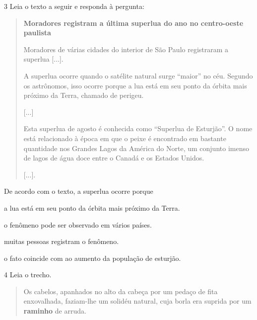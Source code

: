 \num{3} Leia o texto a seguir e responda à pergunta:

\begin{quote}
\textbf{Moradores registram a última superlua do ano no centro-oeste
paulista}

Moradores de várias cidades do interior de São Paulo registraram a
superlua {[}...{]}.

A superlua ocorre quando o satélite natural surge “maior” no céu.
Segundo os astrônomos, isso ocorre porque a lua está em seu ponto da
órbita mais próximo da Terra, chamado de perigeu.

{[}...{]}

Esta superlua de agosto é conhecida como “Superlua de Esturjão”. O
nome está relacionado à época em que o peixe é encontrado em bastante
quantidade nos Grandes Lagos da América do Norte, um conjunto imenso de
lagos de água doce entre o Canadá e os Estados Unidos.

{[}...{]}.

\end{quote}

De acordo com o texto, a superlua ocorre porque

\begin{escolha}
\item a lua está em seu ponto da órbita mais próximo da Terra.

\item o fenômeno pode ser observado em vários países.

\item muitas pessoas registram o fenômeno.

\item o fato coincide com ao aumento da população de esturjão.
\end{escolha}


\num{4} Leia o trecho.

\begin{quote}
Os cabelos, apanhados no alto da cabeça por um pedaço de fita
enxovalhada, faziam-lhe um solidéu natural, cuja borla era suprida por
um \textbf{raminho} de arruda.

\end{quote}

